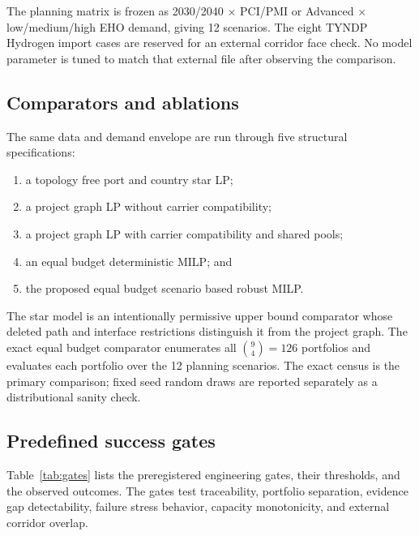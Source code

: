 \documentclass{ieeeaccess}
\begin{document}
The planning matrix is frozen as 2030/2040 $\times$ PCI/PMI or Advanced $\times$ low/medium/high EHO demand, giving 12 scenarios. The eight TYNDP Hydrogen import cases are reserved for an external corridor face check. No model parameter is tuned to match that external file after observing the comparison.

\subsection{Comparators and ablations}

The same data and demand envelope are run through five structural specifications:
\begin{enumerate}
\item a topology free port and country star LP;
\item a project graph LP without carrier compatibility;
\item a project graph LP with carrier compatibility and shared pools;
\item an equal budget deterministic MILP; and
\item the proposed equal budget scenario based robust MILP.
\end{enumerate}
The star model is an intentionally permissive upper bound comparator whose deleted path and interface restrictions distinguish it from the project graph. The exact equal budget comparator enumerates all $\binom{9}{4}=126$ portfolios and evaluates each portfolio over the 12 planning scenarios. The exact census is the primary comparison; fixed seed random draws are reported separately as a distributional sanity check.

\subsection{Predefined success gates}

Table~\ref{tab:gates} lists the preregistered engineering gates, their thresholds, and the observed outcomes. The gates test traceability, portfolio separation, evidence gap detectability, failure stress behavior, capacity monotonicity, and external corridor overlap.
\end{document}
